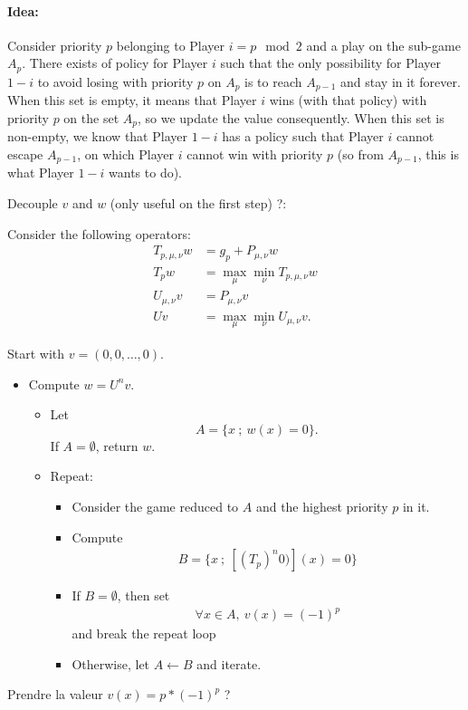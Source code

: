 \documentclass{article}
\begin{document}
\paragraph{Idea:} Consider priority $p$ belonging to Player $i=p \mod 2$ and a play on the sub-game $A_p$. There exists of policy for Player $i$ such that the only possibility for Player $1-i$ to avoid losing with priority $p$ on $A_p$ is to reach $A_{p-1}$ and stay in it forever. When this set is empty, it means that Player $i$ wins (with that policy) with priority $p$ on the set $A_p$, so we update the value consequently. When this set is non-empty, we know that Player $1-i$ has a policy such that Player $i$ cannot escape $A_{p-1}$, on which Player $i$ cannot win with priority $p$ (so from $A_{p-1}$, this is what Player $1-i$ wants to do).

\newpage
Decouple $v$ and $w$ (only useful on the first step) ?:

Consider the following operators:
\begin{align}
  T_{p,\mu,\nu}w & = g_p + P_{\mu,\nu} w\\
  T_{p}w & = \max_\mu \min_\nu T_{p,\mu,\nu}w\\
  U_{\mu,\nu} v & = P_{\mu,\nu}v \\
  U v & = \max_\mu \min_\nu U_{\mu,\nu}v.
\end{align}


Start with $v=(0,0,\dots,0)$.
\begin{itemize}
\item Compute $w=U^n v$.
  \begin{itemize}
  \item Let $$A=\{ x ~;~ w(x)=0 \}.$$ If $A=\emptyset$, return $w$.
    \item Repeat:
      \begin{itemize}
      \item Consider the game reduced to $A$ and the highest priority $p$ in it.
      \item Compute
        \begin{align}
          B = \{x ~;~ [(T_p)^n 0)](x)=0 \}
        \end{align}
      \item If $B=\emptyset$, then set
        \begin{align}
          \forall x \in A,~ v(x)=(-1)^p
        \end{align}
        and break the repeat loop
      \item Otherwise, let $A \leftarrow B$ and iterate.
      \end{itemize}
  \end{itemize}
\end{itemize}


Prendre la valeur $v(x)=p*(-1)^p$ ?


 
\end{document}
